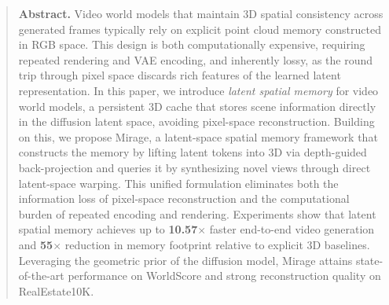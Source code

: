 \begin{abstract}
\textbf{Abstract.}
Video world models that maintain 3D spatial consistency across generated frames typically rely on explicit point cloud memory constructed in RGB space. This design is both computationally expensive, requiring repeated rendering and VAE encoding, and inherently lossy, as the round trip through pixel space discards rich features of the learned latent representation. In this paper, we introduce \emph{latent spatial memory} for video world models, a persistent 3D cache that stores scene information directly in the diffusion latent space, avoiding pixel-space reconstruction. Building on this, we propose Mirage, a latent-space spatial memory framework that constructs the memory by lifting latent tokens into 3D via depth-guided back-projection and queries it by synthesizing novel views through direct latent-space warping.  This unified formulation eliminates both the information loss of pixel-space reconstruction and the computational burden of repeated encoding and rendering. Experiments show that latent spatial memory achieves up to \textbf{10.57}$\times$ faster end-to-end video generation and \textbf{55}$\times$ reduction in memory footprint relative to explicit 3D baselines. Leveraging the geometric prior of the diffusion model, Mirage attains state-of-the-art performance on WorldScore and strong reconstruction quality on RealEstate10K.
\end{abstract}
